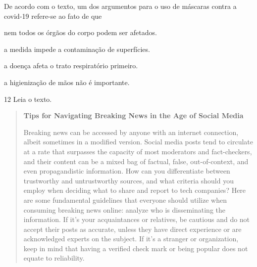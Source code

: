 \begin{escolha}
\begin{escolha}
\begin{escolha}
\begin{quote}
\end{quote}

De acordo com o texto, um dos argumentos para o uso de máscaras contra a
covid-19 refere-se ao fato de que

\begin{escolha}
\item nem todos os órgãos do corpo podem ser afetados.

\item a medida impede a contaminação de superfícies.

\item a doença afeta o trato respiratório primeiro.

\item a higienização de mãos não é importante.
\end{escolha}

\num{12} Leia o texto.

\begin{quote}
\textbf{Tips for Navigating Breaking News in the Age of Social Media}

Breaking news can be accessed by anyone with an internet connection,
albeit sometimes in a modified version. Social media posts tend to
circulate at a rate that surpasses the capacity of most moderators and
fact-checkers, and their content can be a mixed bag of factual, false,
out-of-context, and even propagandistic information. How can you
differentiate between trustworthy and untrustworthy sources, and what
criteria should you employ when deciding what to share and report to
tech companies? Here are some fundamental guidelines that everyone
should utilize when consuming breaking news online: analyze who is
disseminating the information. If it's your acquaintances or relatives,
be cautious and do not accept their posts as accurate, unless they have
direct experience or are acknowledged experts on the subject. If it's a
stranger or organization, keep in mind that having a verified check mark
or being popular does not equate to reliability.

\end{quote}


\end{escolha}
\end{escolha}
\end{escolha}
